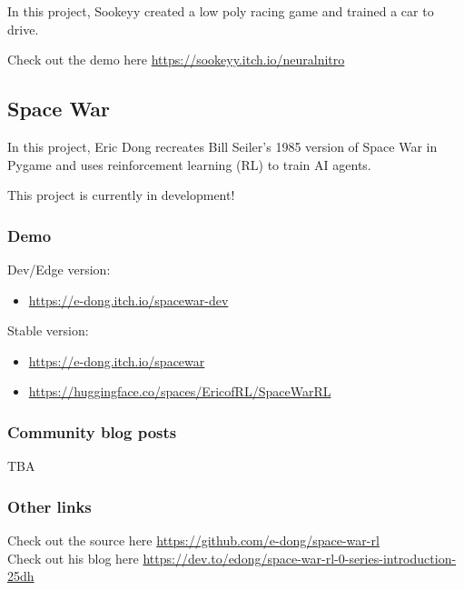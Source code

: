 \documentclass[11pt,a4paper]{article}
\begin{document}
In this project, Sookeyy created a low poly racing game and trained a car to drive.

Check out the demo here \url{https://sookeyy.itch.io/neuralnitro}

\subsection{Space War}\label{space-war}


In this project, Eric Dong recreates Bill Seiler's 1985 version of Space War in Pygame and uses reinforcement learning (RL) to train AI agents.

This project is currently in development!

\subsubsection{Demo}\label{demo}

Dev/Edge version:

\begin{itemize}
\tightlist
\item
  \url{https://e-dong.itch.io/spacewar-dev}
\end{itemize}

Stable version:

\begin{itemize}
\item
  \url{https://e-dong.itch.io/spacewar}
\item
  \url{https://huggingface.co/spaces/EricofRL/SpaceWarRL}
\end{itemize}

\subsubsection{Community blog posts}\label{community-blog-posts}

TBA

\subsubsection{Other links}\label{other-links}

Check out the source here \url{https://github.com/e-dong/space-war-rl}\\
Check out his blog here \url{https://dev.to/edong/space-war-rl-0-series-introduction-25dh}
\end{document}
